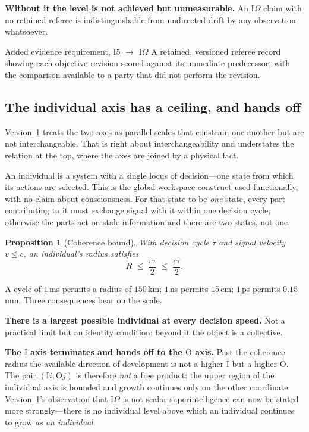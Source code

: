\documentclass[11pt]{article}
\newtheorem{proposition}{Proposition}
\newcommand{\Ilev}[1]{\ensuremath{\mathrm{I}#1}}
\newcommand{\Olev}[1]{\ensuremath{\mathrm{O}#1}}
\newcommand{\IOm}{\ensuremath{\mathrm{I}\Omega}}
\begin{document}
\textbf{Without it the level is not achieved but unmeasurable.} An \IOm{} claim with no retained referee is indistinguishable from undirected drift by any observation whatsoever.

\begin{claimbox}{Added evidence requirement, \Ilev{5} $\to$ \IOm{}}
A retained, versioned referee record showing each objective revision scored against its immediate predecessor, with the comparison available to a party that did not perform the revision.
\end{claimbox}

\subsection{The individual axis has a ceiling, and hands off}\label{sec:ceiling}

Version~1 treats the two axes as parallel scales that constrain one another but are not interchangeable. That is right about interchangeability and understates the relation at the top, where the axes are joined by a physical fact.

An individual is a system with a single locus of decision---one state from which its actions are selected. This is the global-workspace construct \citep{baars1988cognitive,dehaene2011experimental} used functionally, with no claim about consciousness. For that state to be \emph{one} state, every part contributing to it must exchange signal with it within one decision cycle; otherwise the parts act on stale information and there are two states, not one.

\begin{proposition}[Coherence bound]\label{prop:coherence}
With decision cycle $\tau$ and signal velocity $v \le c$, an individual's radius satisfies
\[
R \;\le\; \frac{v\tau}{2} \;\le\; \frac{c\tau}{2}.
\]
\end{proposition}

A cycle of $1$\,ms permits a radius of $150$\,km; $1$\,ns permits $15$\,cm; $1$\,ps permits $0.15$\,mm. Three consequences bear on the scale.

\textbf{There is a largest possible individual at every decision speed.} Not a practical limit but an identity condition: beyond it the object is a collective.

\textbf{The \Ilev{} axis terminates and hands off to the \Olev{} axis.} Past the coherence radius the available direction of development is not a higher \Ilev{} but a higher \Olev{}. The pair $(\Ilev{i}, \Olev{j})$ is therefore \emph{not} a free product: the upper region of the individual axis is bounded and growth continues only on the other coordinate. Version~1's observation that \IOm{} is not scalar superintelligence can now be stated more strongly---there is no individual level above which an individual continues to grow \emph{as an individual}.
\end{document}
